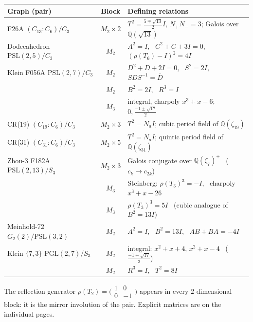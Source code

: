 \documentclass[11pt]{article}
\newcommand{\Q}{\mathbb{Q}}
\begin{document}
\bigskip
\renewcommand{\arraystretch}{1.75}
\begin{center}
\begin{tabular}{@{}lcl@{}}
\hline
\textbf{Graph (pair)} & \textbf{Block} & \textbf{Defining relations} \\
\hline
F26A \quad $(C_{13}{:}C_6)/C_3$ & $M_2\times2$ &
  $T^2=\tfrac{5\mp\sqrt{13}}2I$, $N_+N_-=3$; Galois over $\Q(\sqrt{13})$ \\
Dodecahedron \quad $\mathrm{PSL}(2,5)/C_3$ & $M_2$ &
  $A^2=I$, \ $C^2+C+3I=0$, \ $(\rho(T_6)-I)^2=4I$ \\
\hline
Klein F056A \quad $\mathrm{PSL}(2,7)/C_3$ & $M_2$ &
  $D^2+D+2I=0$, \ $S^2=2I$, \ $SDS^{-1}=\bar D$ \\
 & $M_2$ & $B^2=2I$, \ $R^3=I$ \\
 & $M_3$ & integral, charpoly $x^3+x-6$; \ $0,\tfrac{-1\pm\sqrt{17}}2$ \\
\hline
CR(19) \quad $(C_{19}{:}C_6)/C_3$ & $M_2\times3$ &
  $T^2=N_aI$; cubic period field of $\Q(\zeta_{19})$ \\
CR(31) \quad $(C_{31}{:}C_6)/C_3$ & $M_2\times5$ &
  $T^2=N_aI$; quintic period field of $\Q(\zeta_{31})$ \\
\hline
Zhou-3 F182A \quad $\mathrm{PSL}(2,13)/S_3$ & $M_2\times3$ &
  Galois conjugate over $\Q(\zeta_7)^+$ \ ($c_k\mapsto c_{2k}$) \\
 & $M_3$ & Steinberg: $\rho(T_3)^3=-I$, \ charpoly $x^3+x-26$ \\
 & $M_3$ & $\rho(T_3)^3=5I$ \ (cubic analogue of $B^2=13I$) \\
\hline
Meinhold-72 \quad $G_2(2)/\mathrm{PSL}(3,2)$ & $M_2$ &
  $A^2=I$, \ $B^2=13I$, \ $AB+BA=-4I$ \\
\hline
Klein $\{7,3\}$ \quad $\mathrm{PGL}(2,7)/S_3$ & $M_2$ &
  integral: $x^2+x+4$, $x^2+x-4$ \ ($\tfrac{-1\pm\sqrt{17}}2$) \\
 & $M_2$ & $R^3=I$, \ $T^2=8I$ \\
\hline
\end{tabular}
\end{center}

\bigskip
The reflection generator $\rho(T_2)=\bigl(\begin{smallmatrix}1&0\\0&-1
\end{smallmatrix}\bigr)$ appears in every $2$-dimensional block: it is the
mirror involution of the pair. Explicit matrices are on the individual pages.
\newpage
\end{document}
